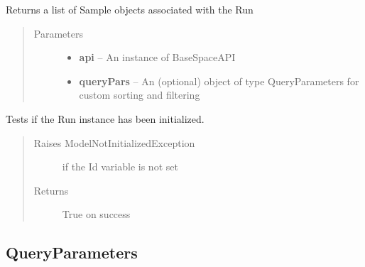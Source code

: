\documentclass[letterpaper,10pt,english]{sphinxmanual}
\begin{document}
\begin{fulllineitems}
\begin{fulllineitems}
\end{fulllineitems}


\begin{fulllineitems}
\label{Available modules:BaseSpacePy.model.Run.Run.getSamples}
Returns a list of Sample objects associated with the Run
\begin{quote}\begin{description}
\item[{Parameters}] \leavevmode\begin{itemize}
\item {} 
\textbf{api} -- An instance of BaseSpaceAPI

\item {} 
\textbf{queryPars} -- An (optional) object of type QueryParameters for custom sorting and filtering

\end{itemize}

\end{description}\end{quote}

\end{fulllineitems}


\begin{fulllineitems}
\label{Available modules:BaseSpacePy.model.Run.Run.isInit}
Tests if the Run instance has been initialized.
\begin{quote}\begin{description}
\item[{Raises ModelNotInitializedException}] \leavevmode
if the Id variable is not set

\item[{Returns}] \leavevmode
True on success

\end{description}\end{quote}

\end{fulllineitems}


\end{fulllineitems}



\subsection{QueryParameters}
\label{Available modules:queryparameters}
\end{document}
